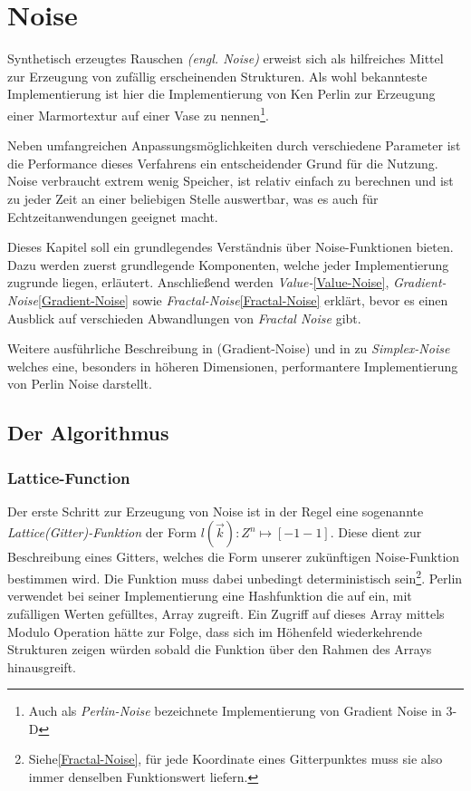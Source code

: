 \chapter{Noise}\label{Noise}
Synthetisch erzeugtes Rauschen \emph{(engl. Noise)} erweist sich als hilfreiches Mittel zur Erzeugung von zufällig erscheinenden Strukturen.
Als wohl bekannteste Implementierung ist hier die Implementierung von Ken Perlin\cite{PERLIN1985} zur Erzeugung einer Marmortextur auf einer Vase zu nennen\footnote{Auch als \emph{Perlin-Noise} bezeichnete Implementierung von Gradient Noise in 3-D}.

Neben umfangreichen Anpassungsmöglichkeiten durch verschiedene Parameter ist die Performance dieses Verfahrens ein entscheidender Grund für die Nutzung. Noise verbraucht extrem wenig Speicher, ist relativ einfach zu berechnen und ist zu jeder Zeit an einer beliebigen Stelle auswertbar, was es auch für Echtzeitanwendungen geeignet macht.\cite{H.Hauser2010}

Dieses Kapitel soll ein grundlegendes Verständnis über Noise-Funktionen bieten. Dazu werden zuerst grundlegende Komponenten, welche jeder Implementierung zugrunde liegen, erläutert. Anschließend werden \emph{Value-}\ref{Value-Noise}, \emph{Gradient-Noise}\ref{Gradient-Noise} sowie \emph{Fractal-Noise}\ref{Fractal-Noise} erklärt, bevor es einen Ausblick auf verschieden Abwandlungen von \emph{Fractal Noise} gibt.

Weitere ausführliche Beschreibung in \cite{BurgerGradientNoise2008} (Gradient-Noise) und in \cite{simplexNoise} zu \emph{Simplex-Noise} welches eine, besonders in höheren Dimensionen, performantere Implementierung von Perlin Noise darstellt.

\section{Der Algorithmus}
\subsection{Lattice-Function}\label{latticeFunc}
Der erste Schritt zur Erzeugung von Noise ist in der Regel eine sogenannte \emph{Lattice(Gitter)-Funktion}\cite{fractalsAndChaos} der Form \begin{math}l(\vec{k}): {Z}^n \mapsto [-1 - 1]\end{math}\label{latticeFunc}.
Diese dient zur Beschreibung eines Gitters, welches die Form unserer zukünftigen Noise-Funktion bestimmen wird. Die Funktion muss dabei unbedingt deterministisch sein\footnote{Siehe\ref{Fractal-Noise}, für jede Koordinate eines Gitterpunktes muss sie also immer denselben Funktionswert liefern.}. Perlin verwendet bei seiner Implementierung eine Hashfunktion die auf ein, mit zufälligen Werten gefülltes, Array zugreift.
Ein Zugriff auf dieses Array mittels Modulo Operation hätte zur Folge, dass sich im Höhenfeld wiederkehrende Strukturen zeigen würden sobald die Funktion über den Rahmen des Arrays hinausgreift.


